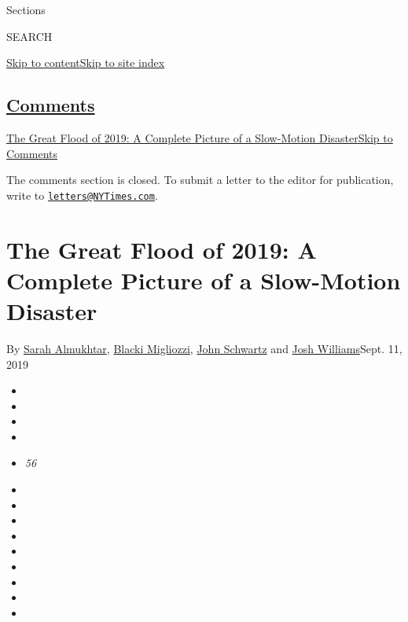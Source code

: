 Sections

SEARCH

\protect\hyperlink{site-content}{Skip to
content}\protect\hyperlink{site-index}{Skip to site index}

\hypertarget{comments}{%
\subsection{\texorpdfstring{\protect\hyperlink{commentsContainer}{Comments}}{Comments}}\label{comments}}

\href{}{The Great Flood of 2019: A Complete Picture of a Slow-Motion
Disaster}\href{}{Skip to Comments}

The comments section is closed. To submit a letter to the editor for
publication, write to
\href{mailto:letters@NYTimes.com}{\nolinkurl{letters@NYTimes.com}}.

\hypertarget{the-great-flood-of-2019-a-complete-picture-of-a-slow-motion-disaster}{%
\section{The Great Flood of 2019: A Complete Picture of a Slow-Motion
Disaster}\label{the-great-flood-of-2019-a-complete-picture-of-a-slow-motion-disaster}}

By \href{https://www.nytimes3xbfgragh.onion/by/sarah-almukhtar}{Sarah
Almukhtar},
\href{https://www.nytimes3xbfgragh.onion/by/blacki-migliozzi}{Blacki
Migliozzi},
\href{https://www.nytimes3xbfgragh.onion/by/john-schwartz}{John
Schwartz} and
\href{https://www.nytimes3xbfgragh.onion/by/josh-williams}{Josh
Williams}Sept. 11, 2019

\begin{itemize}
\item
\item
\item
\item
\item
  \emph{56}
\end{itemize}

\begin{itemize}
\item
\item
\item
\item
\item
\item
\item
\item
\item
\end{itemize}

